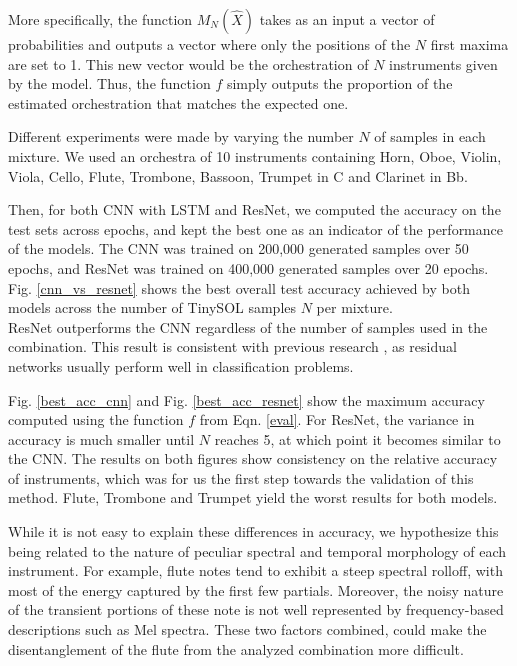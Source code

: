 \documentclass{article}
\begin{document}
More specifically, the function $M_N(\hat{X})$ takes as an input a vector of probabilities and outputs a vector where only the positions of the $N$ first maxima are set to 1. This new vector would be the orchestration of $N$ instruments given by the model. Thus, the function $f$ simply outputs the proportion of the estimated orchestration that matches the expected one.

Different experiments were made by varying the number $N$ of samples in each mixture. We used an orchestra of 10 instruments containing Horn, Oboe, Violin, Viola, Cello, Flute, Trombone, Bassoon, Trumpet in C and Clarinet in Bb.

Then, for both CNN with LSTM and ResNet, we computed the accuracy on the test sets across epochs, and kept the best one as an indicator of the performance of the models. 
The CNN was trained on 200,000 generated samples over 50 epochs, and ResNet was trained on 400,000 generated samples over 20 epochs. Fig. \ref{cnn_vs_resnet} shows the best overall test accuracy achieved by both models across the number of TinySOL samples $N$ per mixture.\\

ResNet outperforms the CNN regardless of the number of samples used in the combination. This result is consistent with previous research \cite{He15}, as residual networks usually perform well in classification problems.

Fig. \ref{best_acc_cnn} and Fig. \ref{best_acc_resnet} show the maximum accuracy computed using the function $f$ from Eqn. \eqref{eval}. For ResNet, the variance in accuracy is much smaller until $N$ reaches 5, at which point it becomes similar to the CNN. The results on both figures show consistency on the relative accuracy of instruments, which was for us the first step towards the validation of this method. Flute, Trombone and Trumpet yield the worst results for both models. 

While it is not easy to explain these differences in accuracy, we hypothesize this being related to the nature of peculiar spectral and temporal morphology of each instrument. For example, flute notes tend to exhibit a steep spectral rolloff, with most of the energy captured by the first few partials. Moreover, the noisy nature of the transient portions of these note is not well represented by frequency-based descriptions such as Mel spectra. These two factors combined, could make the disentanglement of the flute from the analyzed combination more difficult.
\end{document}
